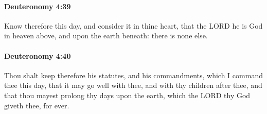 		\paragraph{Deuteronomy 4:39} %
			\label{DEUTERONOMY-4-39}

			Know therefore this day, and consider it in thine heart, that the LORD he is God in heaven above, and upon the earth beneath: there is none else.


		\paragraph{Deuteronomy 4:40} %
			\label{DEUTERONOMY-4-40}

			Thou shalt keep therefore his statutes, and his commandments, which I command thee this day, that it may go well with thee, and with thy children after thee, and that thou mayest prolong thy days upon the earth, which the LORD thy God giveth thee, for ever.

